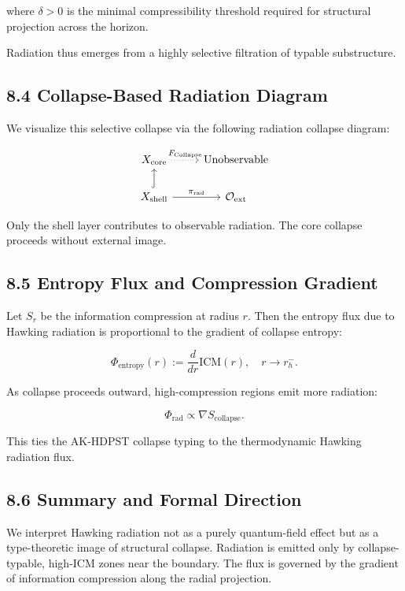 \documentclass[11pt]{article}
\begin{document}
where \( \delta > 0 \) is the minimal compressibility threshold required for structural projection across the horizon.

Radiation thus emerges from a highly selective filtration of typable substructure.

\subsection*{8.4 Collapse-Based Radiation Diagram}

We visualize this selective collapse via the following radiation collapse diagram:

\[
\begin{tikzcd}
X_{\mathrm{core}} \arrow[r, dotted, "F_{\mathrm{Collapse}}"] & \text{Unobservable} \\
X_{\mathrm{shell}} \arrow[u, hook] \arrow[r, "\pi_{\mathrm{rad}}"]
& \mathcal{O}_{\mathrm{ext}}
\end{tikzcd}
\]

Only the shell layer contributes to observable radiation. The core collapse proceeds without external image.

\subsection*{8.5 Entropy Flux and Compression Gradient}

Let \( S_r \) be the information compression at radius \( r \). Then the entropy flux due to Hawking radiation is proportional to the gradient of collapse entropy:

\[
\Phi_{\mathrm{entropy}}(r) := \frac{d}{dr} \mathrm{ICM}(r), \quad r \to r_h^-.
\]

As collapse proceeds outward, high-compression regions emit more radiation:

\[
\Phi_{\mathrm{rad}} \propto \nabla S_{\mathrm{collapse}}.
\]

This ties the AK-HDPST collapse typing to the thermodynamic Hawking radiation flux.

\subsection*{8.6 Summary and Formal Direction}

We interpret Hawking radiation not as a purely quantum-field effect but as a type-theoretic image of structural collapse. Radiation is emitted only by collapse-typable, high-ICM zones near the boundary. The flux is governed by the gradient of information compression along the radial projection.
\end{document}
